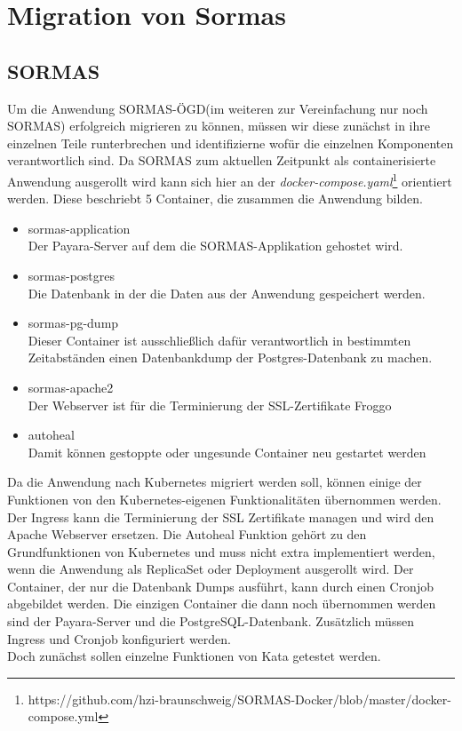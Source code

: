 \chapter{Migration von Sormas}

\section{SORMAS}
\label{ref:sormas_strucure}
Um die Anwendung \ac{SORMAS-ÖGD}(im weiteren zur Vereinfachung nur noch \ac{SORMAS}) erfolgreich migrieren zu können, müssen wir diese zunächst in ihre einzelnen Teile runterbrechen und identifizierne wofür die einzelnen Komponenten verantwortlich sind.
Da \ac{SORMAS} zum aktuellen Zeitpunkt als containerisierte Anwendung ausgerollt wird kann sich hier an der \textit{docker-compose.yaml}\footnote{https://github.com/hzi-braunschweig/SORMAS-Docker/blob/master/docker-compose.yml} orientiert werden.
Diese beschriebt 5 Container, die zusammen die Anwendung bilden.
\begin{itemize}
    \item sormas-application \\ Der Payara-Server auf dem die \ac{SORMAS}-Applikation gehostet wird.
    \item sormas-postgres \\ Die Datenbank in der die Daten aus der Anwendung gespeichert werden.
    \item sormas-pg-dump \\ Dieser Container ist ausschließlich dafür verantwortlich in bestimmten Zeitabständen einen Datenbankdump der Postgres-Datenbank zu machen.
    \item sormas-apache2 \\ Der Webserver ist für die Terminierung der \ac{SSL}-Zertifikate Froggo
    \item autoheal \\ Damit können gestoppte oder ungesunde Container neu gestartet werden
\end{itemize}
Da die Anwendung nach Kubernetes migriert werden soll, können einige der Funktionen von den Kubernetes-eigenen Funktionalitäten übernommen werden. 
Der Ingress kann die Terminierung der \ac{SSL} Zertifikate managen und wird den Apache Webserver ersetzen.
Die Autoheal Funktion gehört zu den Grundfunktionen von Kubernetes und muss nicht extra implementiert werden, wenn die Anwendung als ReplicaSet oder Deployment ausgerollt wird.
Der Container, der nur die Datenbank Dumps ausführt, kann durch einen Cronjob abgebildet werden. 
Die einzigen Container die dann noch übernommen werden sind der Payara-Server und die PostgreSQL-Datenbank.
Zusätzlich müssen Ingress und Cronjob konfiguriert werden. \\
Doch zunächst sollen einzelne Funktionen von Kata getestet werden.


